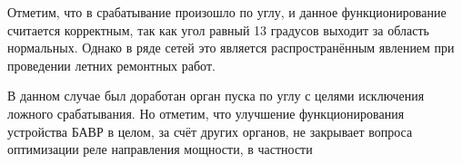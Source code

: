 Отметим, что в срабатывание произошло по углу, и данное функционирование считается
корректным, так как угол равный 13 градусов выходит за область нормальных. Однако в ряде
сетей это является распространённым явлением при проведении летних ремонтных работ.

В данном случае был доработан орган пуска по углу с целями исключения ложного срабатывания. Но отметим, что улучшение функционирования устройства БАВР в целом, за счёт других органов, не закрывает вопроса оптимизации реле направления мощности, в частности
